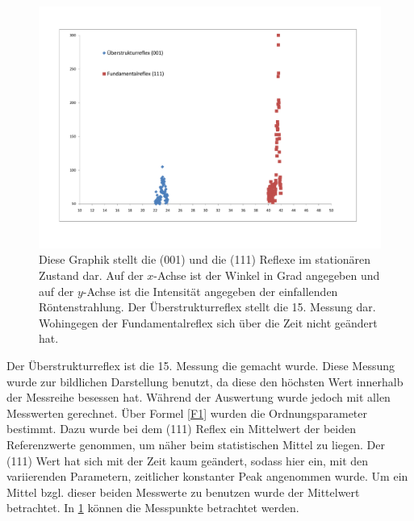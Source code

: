 \begin{figure}[h!]
    \centering
    \includegraphics[scale = 0.6]{001 und 111.pdf}
    \caption{Diese Graphik stellt die (001) und die (111) Reflexe im stationären Zustand dar. Auf der $x$-Achse ist der Winkel in Grad angegeben und auf der $y$-Achse ist die Intensität angegeben der einfallenden Röntenstrahlung. Der Überstrukturreflex stellt die 15. Messung dar. Wohingegen der Fundamentalreflex sich über die Zeit nicht geändert hat.}
    \label{A4}
\end{figure}
Der Überstrukturreflex ist die 15. Messung die gemacht wurde. Diese Messung wurde zur bildlichen Darstellung benutzt, da diese den höchsten Wert innerhalb der Messreihe besessen hat. Während der Auswertung wurde jedoch mit allen Messwerten gerechnet.
Über Formel \cref{F1} wurden die Ordnungsparameter bestimmt. Dazu wurde bei dem (111) Reflex ein Mittelwert der beiden Referenzwerte genommen, um näher beim statistischen Mittel zu liegen. Der (111) Wert hat sich mit der Zeit kaum geändert, sodass hier ein, mit den variierenden Parametern, zeitlicher konstanter Peak angenommen wurde. Um ein Mittel bzgl. dieser beiden Messwerte zu benutzen wurde der Mittelwert betrachtet. In \cref{A4} können die Messpunkte betrachtet werden. 
